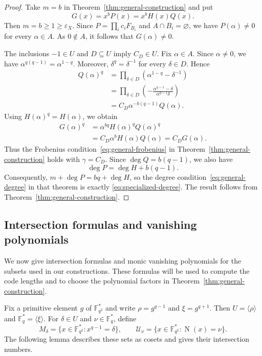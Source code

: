 \documentclass[preprint,12pt,a4paper]{elsarticle}
\newcommand{\N}{\operatorname{N}}
\begin{document}
\begin{proof}
Take $m=b$ in Theorem~\ref{thm:general-construction} and put
\[
 G(x)=x^bP(x)=x^bH(x)Q(x).
\]
Then $m=b\ge1\ge\varepsilon_X$. Since $P=\prod_i c_iF_{B_i}$ and $A\cap B_i=\varnothing$, we have $P(\alpha)\ne0$ for every $\alpha\in A$. As $0\notin A$, it follows that $G(\alpha)\ne0$.

The inclusions $-1\in U$ and $D\subseteq U$ imply $C_D\in U$. Fix $\alpha\in A$. Since $\alpha\ne0$, we have $\alpha^{q(q-1)}=\alpha^{1-q}$. Moreover, $\delta^q=\delta^{-1}$ for every $\delta\in D$. Hence
\[
\begin{aligned}
 Q(\alpha)^q
 &=\prod_{\delta\in D}(\alpha^{1-q}-\delta^{-1})\\
 &=\prod_{\delta\in D}\left(-\frac{\alpha^{q-1}-\delta}{\alpha^{q-1}\delta}\right)\\
 &=C_D\alpha^{-b(q-1)}Q(\alpha).
\end{aligned}
\]
Using $H(\alpha)^q=H(\alpha)$, we obtain
\[
\begin{aligned}
 G(\alpha)^q
 &=\alpha^{bq}H(\alpha)^qQ(\alpha)^q\\
 &=C_D\alpha^bH(\alpha)Q(\alpha)
 =C_DG(\alpha).
\end{aligned}
\]
Thus the Frobenius condition~\eqref{eq:general-frobenius} in Theorem~\ref{thm:general-construction} holds with $\gamma=C_D$. Since $\deg Q=b(q-1)$, we also have
\[
 \deg P=\deg H+b(q-1).
\]
Consequently, $m+\deg P=bq+\deg H$, so the degree condition~\eqref{eq:general-degree} in that theorem is exactly \eqref{eq:specialized-degree}. The result follows from Theorem~\ref{thm:general-construction}.
\end{proof}

\subsection{Intersection formulas and vanishing polynomials}

We now give intersection formulas and monic vanishing polynomials for the subsets used in our constructions. These formulas will be used to compute the code lengths and to choose the polynomial factors in Theorem~\ref{thm:general-construction}.

Fix a primitive element $g$ of $\mathbb F_{q^2}^{*}$ and write $\rho=g^{q-1}$ and $\xi=g^{q+1}$. Then $U=\langle\rho\rangle$ and $\mathbb F_q^{*}=\langle\xi\rangle$. For $\delta\in U$ and $\nu\in\mathbb F_q^{*}$, define
\[
 M_\delta=\{x\in\mathbb F_{q^2}^{*}:x^{q-1}=\delta\},
 \qquad
 \mathcal U_\nu=\{x\in\mathbb F_{q^2}^{*}:\N(x)=\nu\}.
\]
The following lemma describes these sets as cosets and gives their intersection numbers.
\end{document}
